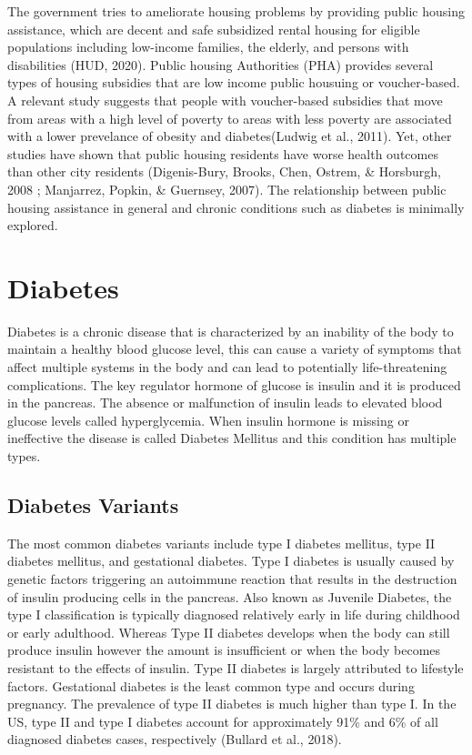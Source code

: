 \documentclass [11pt, proquest] {uwthesis}[2015/03/03]
\begin{document}
The government tries to ameliorate housing problems by providing public
housing assistance, which are decent and safe subsidized rental housing
for eligible populations including low-income families, the elderly, and
persons with disabilities (HUD, 2020). Public housing Authorities (PHA)
provides several types of housing subsidies that are low income public
housuing or voucher-based. A relevant study suggests that people with
voucher-based subsidies that move from areas with a high level of
poverty to areas with less poverty are associated with a lower
prevelance of obesity and diabetes(Ludwig et al., 2011). Yet, other
studies have shown that public housing residents have worse health
outcomes than other city residents (Digenis-Bury, Brooks, Chen, Ostrem,
\& Horsburgh, 2008 ; Manjarrez, Popkin, \& Guernsey, 2007). The
relationship between public housing assistance in general and chronic
conditions such as diabetes is minimally explored.

\section{Diabetes}\label{diabetes}

Diabetes is a chronic disease that is characterized by an inability of
the body to maintain a healthy blood glucose level, this can cause a
variety of symptoms that affect multiple systems in the body and can
lead to potentially life-threatening complications. The key regulator
hormone of glucose is insulin and it is produced in the pancreas. The
absence or malfunction of insulin leads to elevated blood glucose levels
called hyperglycemia. When insulin hormone is missing or ineffective the
disease is called Diabetes Mellitus and this condition has multiple
types.

\subsection{Diabetes Variants}\label{diabetes-variants}

The most common diabetes variants include type I diabetes mellitus, type
II diabetes mellitus, and gestational diabetes. Type I diabetes is
usually caused by genetic factors triggering an autoimmune reaction that
results in the destruction of insulin producing cells in the pancreas.
Also known as Juvenile Diabetes, the type I classification is typically
diagnosed relatively early in life during childhood or early adulthood.
Whereas Type II diabetes develops when the body can still produce
insulin however the amount is insufficient or when the body becomes
resistant to the effects of insulin. Type II diabetes is largely
attributed to lifestyle factors. Gestational diabetes is the least
common type and occurs during pregnancy. The prevalence of type II
diabetes is much higher than type I. In the US, type II and type I
diabetes account for approximately 91\% and 6\% of all diagnosed
diabetes cases, respectively (Bullard et al., 2018).
\end{document}
